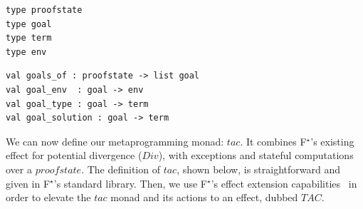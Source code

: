 \documentclass[runningheads]{llncs}
\newcommand{\kw}[1]{\text{\ls|#1|}}
\newcommand\fstar{F$^\star$\xspace}
\begin{document}

\vspace{-5mm}
\noindent
\begin{minipage}[t]{.50\textwidth}
\begin{lstlisting}
type proofstate
type goal
type term
type env
\end{lstlisting}
\end{minipage}
\begin{minipage}[t]{.50\textwidth}
\begin{lstlisting}
val goals_of : proofstate -> list goal
val goal_env  : goal -> env
val goal_type : goal -> term
val goal_solution : goal -> term
\end{lstlisting}
\end{minipage}
%
%
%
We can now define our metaprogramming monad: \ls$tac$.
%
It combines \fstar's existing effect for potential divergence (\ls$Div$),
with exceptions and stateful
computations over a \ls$proofstate$.
%
The definition of \ls$tac$, shown below, is straightforward and given in
\fstar's standard library.
%
Then, we use \fstar's effect extension capabilities~\cite{dm4free}
in order to
elevate the \ls$tac$ monad and its actions to an effect, dubbed
\ls$TAC$.
 
\end{document}
